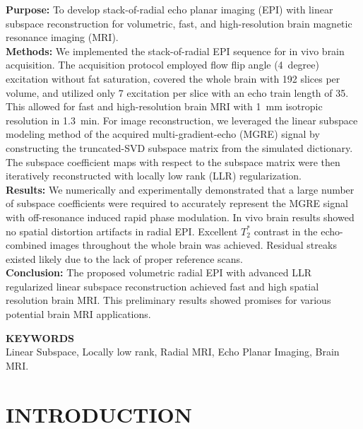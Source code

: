 \documentclass[a4paper,11pt]{article}
\begin{document}
\pagebreak


\doublespacing

\noindent
\textbf{Purpose:} To develop stack-of-radial echo planar imaging (EPI) 
with linear subspace reconstruction for volumetric, fast, and high-resolution 
brain magnetic resonance imaging (MRI).\\
\textbf{Methods:} We implemented the stack-of-radial EPI 
sequence for in vivo brain acquisition. 
The acquisition protocol employed flow flip angle (4~degree) excitation 
without fat saturation, 
covered the whole brain with 192 slices per volume, 
and utilized only 7 excitation per slice 
with an echo train length of 35. 
This allowed for fast and high-resolution brain MRI 
with \SI{1}{\mm} isotropic resolution in \SI{1.3}{\minute}. 
For image reconstruction, 
we leveraged the linear subspace modeling method 
of the acquired multi-gradient-echo (MGRE) signal 
by constructing the truncated-SVD subspace matrix from the simulated dictionary. 
The subspace coefficient maps with respect to the subspace matrix were then 
iteratively reconstructed with locally low rank (LLR) regularization. \\
\textbf{Results:} We numerically and experimentally demonstrated that 
a large number of subspace coefficients were required to accurately 
represent the MGRE signal with off-resonance induced rapid phase modulation. 
In vivo brain results showed no spatial distortion artifacts in radial EPI. 
Excellent $T_2^*$ contrast in the echo-combined images 
throughout the whole brain was achieved. 
Residual streaks existed likely due to the lack of proper reference scans.\\
\textbf{Conclusion:} The proposed volumetric radial EPI 
with advanced LLR regularized linear subspace reconstruction 
achieved fast and high spatial resolution brain MRI. 
This preliminary results showed promises for 
various potential brain MRI applications.

\vspace*{3.0\baselineskip}
\noindent 
\textbf{KEYWORDS} \\
Linear Subspace,
Locally low rank,
Radial MRI,
Echo Planar Imaging,
Brain MRI.

\vfill
\pagebreak


\section{INTRODUCTION}
\end{document}
